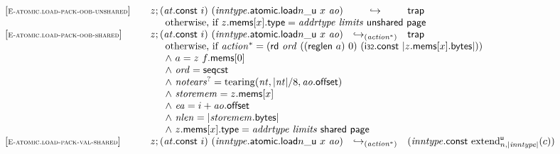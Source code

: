 $$\begin{array}[t]{@{}lrcl@{}l@{}}
{[\textsc{\scriptsize E{-}atomic.load{-}pack{-}oob{-}unshared}]} \quad & z ; ({\mathit{at}}{.}\mathsf{const}~i)~({{\mathit{inntype}}{.}\mathsf{atomic}{.}\mathsf{load}}{{n}{\mathsf{\_}}{\mathsf{u}}}~x~{\mathit{ao}}) & \hookrightarrow & \mathsf{trap} &  \\
& \multicolumn{4}{@{}l@{}}{\quad
\quad \mbox{otherwise, if}~ z{.}\mathsf{mems}{}[x]{.}\mathsf{type} = {\mathit{addrtype}}~{\mathit{limits}}~\mathsf{unshared}~\mathsf{page}
} \\
{[\textsc{\scriptsize E{-}atomic.load{-}pack{-}oob{-}shared}]} \quad & z ; ({\mathit{at}}{.}\mathsf{const}~i)~({{\mathit{inntype}}{.}\mathsf{atomic}{.}\mathsf{load}}{{n}{\mathsf{\_}}{\mathsf{u}}}~x~{\mathit{ao}}) & {\hookrightarrow}_{({{\mathit{action}}^\ast})} {} & \mathsf{trap} &  \\
& \multicolumn{4}{@{}l@{}}{\quad
\quad
\begin{array}[t]{@{}l@{}}
\mbox{otherwise, if}~ {{\mathit{action}}^\ast} = (\mathsf{rd}~{\mathit{ord}}~((\mathsf{reglen}~a)~0)~(\mathsf{i{\scriptstyle 32}}{.}\mathsf{const}~{|z{.}\mathsf{mems}{}[x]{.}\mathsf{bytes}|})) \\
{\land}~ a = z~f{.}\mathsf{mems}{}[0] \\
{\land}~ {\mathit{ord}} = \mathsf{seqcst} \\
{\land}~ {{\mathit{notears}}^?} = {\mathrm{tearing}}({\mathit{nt}}, {|{\mathit{nt}}|} / 8, {\mathit{ao}}{.}\mathsf{offset}) \\
{\land}~ {\mathit{storemem}} = z{.}\mathsf{mems}{}[x] \\
{\land}~ {\mathit{ea}} = i + {\mathit{ao}}{.}\mathsf{offset} \\
{\land}~ {\mathit{nlen}} = {|{\mathit{storemem}}{.}\mathsf{bytes}|} \\
{\land}~ z{.}\mathsf{mems}{}[x]{.}\mathsf{type} = {\mathit{addrtype}}~{\mathit{limits}}~\mathsf{shared}~\mathsf{page} \\
\end{array}
} \\
{[\textsc{\scriptsize E{-}atomic.load{-}pack{-}val{-}shared}]} \quad & z ; ({\mathit{at}}{.}\mathsf{const}~i)~({{\mathit{inntype}}{.}\mathsf{atomic}{.}\mathsf{load}}{{n}{\mathsf{\_}}{\mathsf{u}}}~x~{\mathit{ao}}) & {\hookrightarrow}_{({{\mathit{action}}^\ast})} {} & ({\mathit{inntype}}{.}\mathsf{const}~{{{{\mathrm{extend}}}_{n, {|{\mathit{inntype}}|}}^{\mathsf{u}}}}{(c)}) &  \\
& \multicolumn{4}{@{}l@{}}{\quad
\quad
\begin{array}[t]{@{}l@{}}

\end{array}}
\end{array}$$
